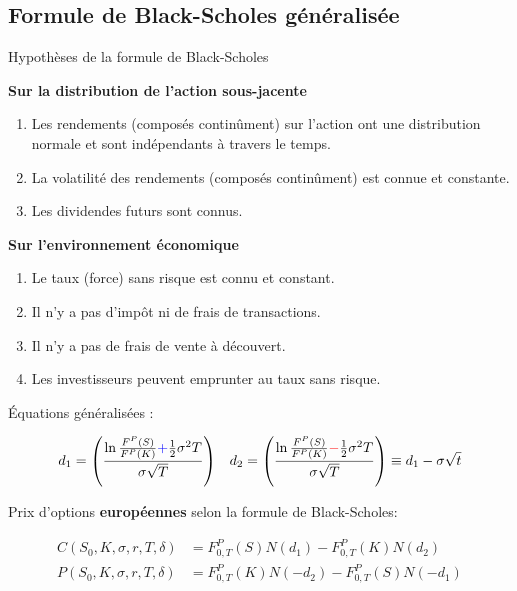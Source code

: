 \documentclass[10pt, french]{article}
\begin{document}
\begin{multicols*}{2}
\subsection*{Formule de Black-Scholes généralisée}
\begin{conceptgen}{Hypothèses de la formule de Black-Scholes}
\begin{center}
	\textbf{Sur la distribution de l'action sous-jacente}
\end{center}
\begin{enumerate}[leftmargin = *, label = \alph*)]
	\item	Les rendements (composés continûment) sur l'action ont une distribution normale et sont indépendants à travers le temps.
	\item	La volatilité des rendements (composés continûment) est connue et constante.
	\item	Les dividendes futurs sont connus.
\end{enumerate}
\tcbline
\begin{center}
	\textbf{Sur l'environnement économique}
\end{center}
\begin{enumerate}[leftmargin = *, label = \alph*)]
	\item	Le taux (force) sans risque est connu et constant.
	\item	Il n'y a pas d'impôt	 ni de frais de transactions.
	\item	Il n'y a pas de frais de vente à découvert.
	\item	Les investisseurs peuvent emprunter au taux sans risque.
\end{enumerate}
\end{conceptgen}

\begin{definitionNOHFILL}
Équations généralisées :

\begin{align*}
	d_{1}
	&=	\left(
			\frac{\ln\frac{F^{P}(S)}{F^{P}(K)} {\color{blue}{+}} \frac{1}{2} \sigma^{2} T}
	 			 {\sigma\sqrt{T}}
		\right)	&
	d_{2}
	&=	\left(
			\frac{\ln\frac{F^{P}(S)}{F^{P}(K)} {\color{red}{-}} \frac{1}{2} \sigma^{2} T}
	 			 {\sigma\sqrt{T}}
		\right)	
	\equiv	d_{1} - \sigma \sqrt{t}	\\
\end{align*}

Prix d'options \textbf{européennes} selon la formule de Black-Scholes:

\begin{align*}
	C(S_{0}, K, \sigma, r, T, \delta)
	&=	F^{P}_{0, T}(S) N(d_{1}) - F^{P}_{0, T}(K) N(d_{2})	\\
	P(S_{0}, K, \sigma, r, T, \delta)
	&=	F^{P}_{0, T}(K) N(-d_{2}) - F^{P}_{0, T}(S) N(-d_{1})	
\end{align*}


\end{definitionNOHFILL}
\end{multicols*}
\end{document}
